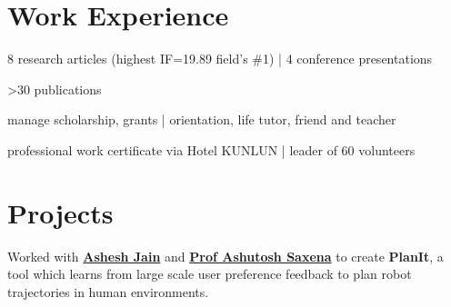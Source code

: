 \documentclass[]{junhu_resume}
\begin{document}
\begin{minipage}[t]{0.66\textwidth} 


\section{Work Experience}
\vspace{\topsep} %
\begin{tightemize}
\item 8 research articles (highest IF=19.89 field's \#1) | 4 conference presentations
\end{tightemize}
\sectionsep

\begin{tightemize}
\item >30 publications
\end{tightemize}
\begin{tightemize}
\item manage scholarship, grants | orientation, life tutor, friend and teacher
\end{tightemize}
\sectionsep

\begin{tightemize}
\item professional work certificate via Hotel KUNLUN | leader of 60 volunteers
\end{tightemize}
\sectionsep



\section{Projects}
Worked with \textbf{\href{http://www.cs.cornell.edu/~ashesh/}{Ashesh Jain}} and \textbf{\href{http://www.cs.cornell.edu/~asaxena/}{Prof Ashutosh Saxena}} to create \textbf{PlanIt}, a tool which  learns from large scale user preference feedback to plan robot trajectories in human environments.  
\sectionsep


\end{minipage}
\end{document}
